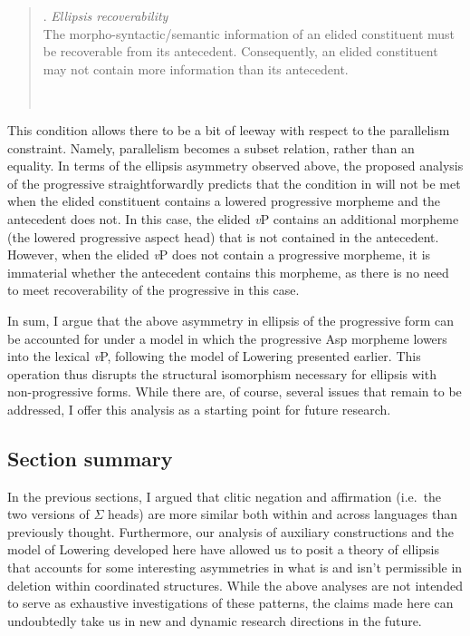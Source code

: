 \singlespacing
\begin{quote}
\begin{minipage}{4.5in}
\ex. {\it Ellipsis recoverability}\\
The morpho-syntactic/semantic information of an elided constituent must be recoverable from its antecedent. Consequently, an elided constituent may not contain more information than its antecedent.

\end{minipage}\\
\end{quote}
\onehalfspacing
This condition allows there to be a bit of leeway with respect to the parallelism constraint. Namely, parallelism becomes a subset relation, rather than an equality. In terms of the ellipsis asymmetry observed above, the proposed analysis of the progressive straightforwardly predicts that the condition in \Last will not be met when the elided constituent contains a lowered progressive morpheme and the antecedent does not. In this case, the elided {\it v}P contains an additional morpheme (the lowered progressive aspect head) that is not contained in the antecedent. However, when the elided {\it v}P does not contain a progressive morpheme, it is immaterial whether the antecedent contains this morpheme, as there is no need to meet recoverability of the progressive in this case.

In sum, I argue that the above asymmetry in ellipsis of the progressive form can be accounted for under a model in which the progressive Asp morpheme lowers into the lexical {\it v}P, following the model of Lowering presented earlier. This operation thus disrupts the structural isomorphism necessary for ellipsis with non-progressive forms. While there are, of course, several issues that remain to be addressed, I offer this analysis as a starting point for future research.

\subsection{Section summary}
In the previous sections, I argued that clitic negation and affirmation (i.e.\ the two versions of $\Sigma$ heads) are more similar both within and across languages than previously thought. Furthermore, our analysis of auxiliary constructions and the model of Lowering developed here have allowed us to posit a theory of ellipsis that accounts for some interesting asymmetries in what is and isn't permissible in deletion within coordinated structures. While the above analyses are not intended to serve as exhaustive investigations of these patterns, the claims made here can undoubtedly take us in new and dynamic research directions in the future.

